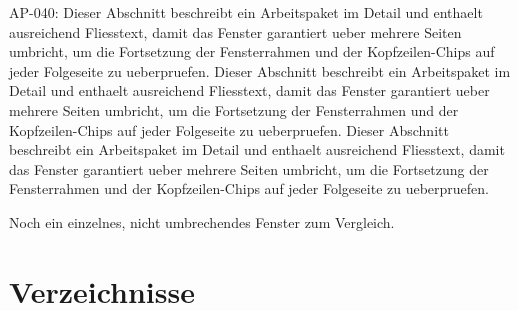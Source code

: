 \documentclass[type=report,theme=dark,language=de]{semio}
\begin{document}
\begin{Table}[title=Lange Tabelle]
AP-040: Dieser Abschnitt beschreibt ein Arbeitspaket im Detail und enthaelt ausreichend Fliesstext, damit das Fenster garantiert ueber mehrere Seiten umbricht, um die Fortsetzung der Fensterrahmen und der Kopfzeilen-Chips auf jeder Folgeseite zu ueberpruefen. Dieser Abschnitt beschreibt ein Arbeitspaket im Detail und enthaelt ausreichend Fliesstext, damit das Fenster garantiert ueber mehrere Seiten umbricht, um die Fortsetzung der Fensterrahmen und der Kopfzeilen-Chips auf jeder Folgeseite zu ueberpruefen. Dieser Abschnitt beschreibt ein Arbeitspaket im Detail und enthaelt ausreichend Fliesstext, damit das Fenster garantiert ueber mehrere Seiten umbricht, um die Fortsetzung der Fensterrahmen und der Kopfzeilen-Chips auf jeder Folgeseite zu ueberpruefen. 
\end{Table}

\begin{Figure}[title=Andere Kurze Figur]
  Noch ein einzelnes, nicht umbrechendes Fenster zum Vergleich.
\end{Figure}

\appendix
\chapter{Verzeichnisse}
\makeregisters
\end{document}
